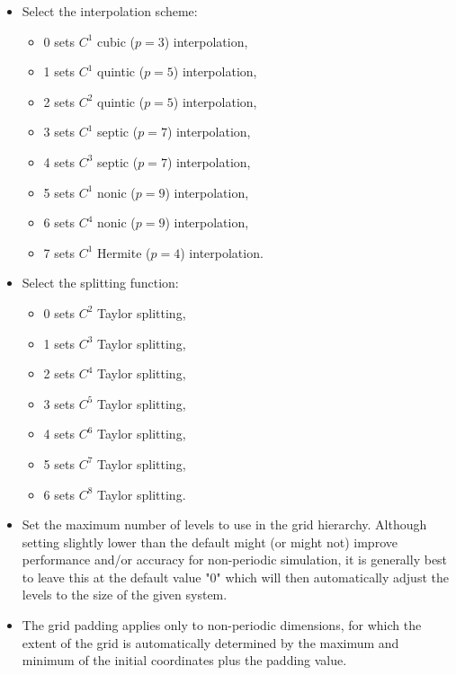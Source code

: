 \begin{itemize}
\item
{}
{Select the interpolation scheme:
\begin{itemize}
\item 0 sets $C^1$ cubic ($p=3$) interpolation,
\item 1 sets $C^1$ quintic ($p=5$) interpolation,
\item 2 sets $C^2$ quintic ($p=5$) interpolation,
\item 3 sets $C^1$ septic ($p=7$) interpolation,
\item 4 sets $C^3$ septic ($p=7$) interpolation,
\item 5 sets $C^1$ nonic ($p=9$) interpolation,
\item 6 sets $C^4$ nonic ($p=9$) interpolation,
\item 7 sets $C^1$ Hermite ($p=4$) interpolation.
\end{itemize}
}

\item
{}
{Select the splitting function: 
\begin{itemize}
\item 0 sets $C^2$ Taylor splitting,
\item 1 sets $C^3$ Taylor splitting,
\item 2 sets $C^4$ Taylor splitting,
\item 3 sets $C^5$ Taylor splitting,
\item 4 sets $C^6$ Taylor splitting,
\item 5 sets $C^7$ Taylor splitting,
\item 6 sets $C^8$ Taylor splitting.
\end{itemize}
}

\item
{}
{Set the maximum number of levels to use in the grid hierarchy. 
Although setting slightly lower than the default might (or might not) 
improve performance and/or accuracy for non-periodic simulation, 
it is generally best to leave this at the default value "0" which will
then automatically adjust the levels to the size of the given system.}

\item
{}
{The grid padding applies only to non-periodic dimensions, for which 
the extent of the grid is automatically determined by the 
maximum and minimum of the initial coordinates plus the padding value.}


\end{itemize}
